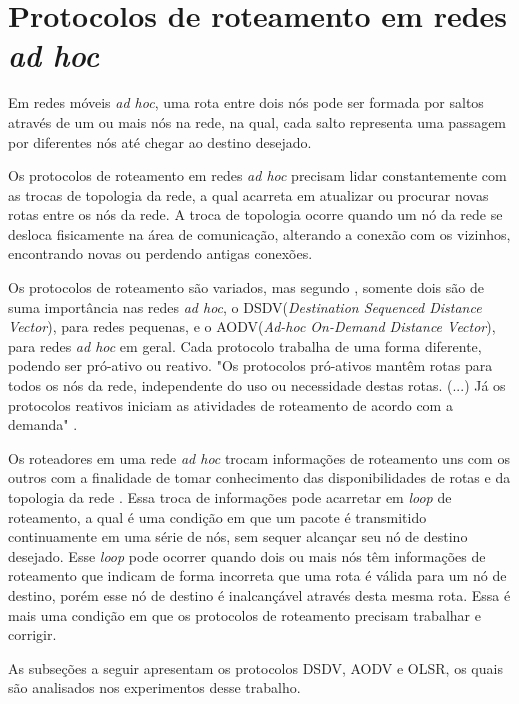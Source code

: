 \section{Protocolos de roteamento em redes \textit{ad hoc}}\label{protocols}

Em redes m\'oveis \textit{ad hoc}, uma rota entre dois n\'os pode ser formada por saltos atrav\'es de um ou mais n\'os na rede, na qual, cada salto representa uma passagem por diferentes n\'os at\'e chegar ao destino desejado. 

Os protocolos de roteamento em redes \textit{ad hoc} precisam lidar constantemente com as trocas de topologia da rede, a qual acarreta em atualizar ou procurar novas rotas entre os n\'os da rede. 
A troca de topologia ocorre quando um n\'o da rede se desloca fisicamente na \'area de comunica\c{c}\~ao, alterando a conex\~ao com os vizinhos, encontrando novas ou perdendo antigas conex\~oes.

Os protocolos de roteamento s\~ao variados, mas segundo \cite{gorantala}, somente dois s\~ao de suma import\^ancia nas redes \textit{ad hoc}, o DSDV(\textit{Destination Sequenced Distance Vector}), para redes pequenas, e o AODV(\textit{Ad-hoc On-Demand Distance Vector}), para redes \textit{ad hoc} em geral. 
Cada protocolo trabalha de uma forma diferente, podendo ser pr\'o-ativo ou reativo. 
"Os protocolos pr\'o-ativos mant\^em rotas para todos os n\'os da rede, independente do uso ou necessidade destas rotas. (...) J\'a os protocolos reativos iniciam as atividades de roteamento de acordo com a demanda" \cite{pereira}.

Os roteadores em uma rede \textit{ad hoc} trocam informa\c{c}\~oes de roteamento uns com os outros com a finalidade de tomar conhecimento das disponibilidades de rotas e da topologia da rede \cite{pereira}. 
Essa troca de informa\c{c}\~oes pode acarretar em \textit{loop} de roteamento, a qual \'e uma condi\c{c}\~ao em que um pacote \'e transmitido continuamente em uma s\'erie de n\'os, sem sequer alcan\c{c}ar seu n\'o de destino desejado. 
Esse \textit{loop} pode ocorrer quando dois ou mais n\'os t\^em informa\c{c}\~oes de roteamento que indicam de forma incorreta que uma rota \'e v\'alida para um n\'o de destino, por\'em esse n\'o de destino \'e inalcan\c{c}\'avel atrav\'es desta mesma rota. 
Essa \'e mais uma condi\c{c}\~ao em que os protocolos de roteamento precisam trabalhar e corrigir.

As subse\c{c}\~oes a seguir apresentam os protocolos DSDV, AODV e OLSR, os quais s\~ao analisados nos experimentos desse trabalho.


